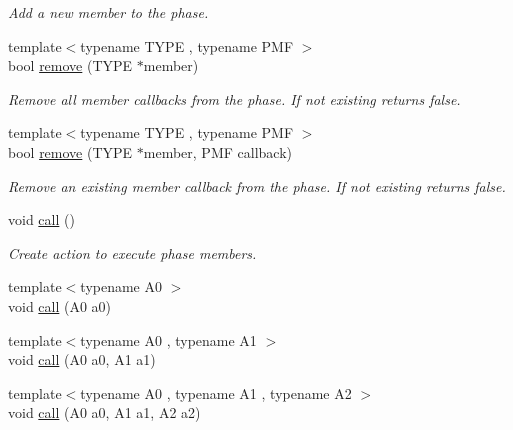 \begin{DoxyCompactItemize}
\begin{DoxyCompactList}\small\item\em Add a new member to the phase. \item\end{DoxyCompactList}\item 
{\footnotesize template$<$typename TYPE , typename PMF $>$ }\\bool \hyperlink{class_d_d4hep_1_1_simulation_1_1_geant4_action_phase_a00496ac37e590398b28f92108e56a35f}{remove} (TYPE $\ast$member)
\begin{DoxyCompactList}\small\item\em Remove all member callbacks from the phase. If not existing returns false. \item\end{DoxyCompactList}\item 
{\footnotesize template$<$typename TYPE , typename PMF $>$ }\\bool \hyperlink{class_d_d4hep_1_1_simulation_1_1_geant4_action_phase_a9759c4205f62d091a35f4fc628ea2847}{remove} (TYPE $\ast$member, PMF callback)
\begin{DoxyCompactList}\small\item\em Remove an existing member callback from the phase. If not existing returns false. \item\end{DoxyCompactList}\item 
void \hyperlink{class_d_d4hep_1_1_simulation_1_1_geant4_action_phase_ae0022a7ef73336336dc256644bd06a12}{call} ()
\begin{DoxyCompactList}\small\item\em Create action to execute phase members. \item\end{DoxyCompactList}\item 
{\footnotesize template$<$typename A0 $>$ }\\void \hyperlink{class_d_d4hep_1_1_simulation_1_1_geant4_action_phase_adcdd1c93f7e68e1172726ab95ab8f86f}{call} (A0 a0)
\item 
{\footnotesize template$<$typename A0 , typename A1 $>$ }\\void \hyperlink{class_d_d4hep_1_1_simulation_1_1_geant4_action_phase_a225034a1d517ce143896aa3e37ed1d0d}{call} (A0 a0, A1 a1)
\item 
{\footnotesize template$<$typename A0 , typename A1 , typename A2 $>$ }\\void \hyperlink{class_d_d4hep_1_1_simulation_1_1_geant4_action_phase_a7446c7f582c82adbb22d967ce1fefe87}{call} (A0 a0, A1 a1, A2 a2)

\end{DoxyCompactItemize}
